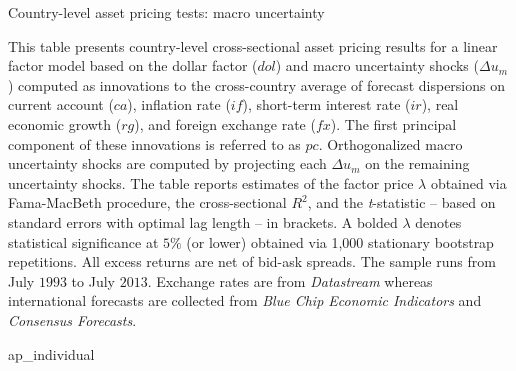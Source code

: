 \begin{landscape}
	
	\begin{table}[ht]
		\caption{Country-level asset pricing tests: macro uncertainty} \label{tab:ap_individual}
		
		\begin{footnotesize}
			This table presents country-level cross-sectional asset pricing results for a linear factor model based on the dollar factor ($dol$) and macro uncertainty shocks ($\Delta u_{m}$) computed as innovations to the cross-country average of forecast dispersions on current account ($ca$), inflation rate ($if$), short-term interest rate ($ir$), real economic growth ($rg$), and foreign exchange rate ($fx$). The first principal component of these innovations is referred to as $pc$. Orthogonalized macro uncertainty shocks are computed by projecting each $\Delta u_{m}$ on the remaining uncertainty shocks. The table reports estimates of the factor price $\lambda$ obtained via Fama-MacBeth procedure, the cross-sectional $R^{2}$, and the \emph{t}-statistic -- based on \citet{newey_west1987} standard errors with \citet{andrews1991} optimal lag length -- in brackets. A bolded $\lambda$ denotes statistical significance at $5\%$ (or lower) obtained via 1,000 stationary bootstrap repetitions. All excess returns are net of bid-ask spreads. The sample runs from July $1993$ to July $2013$. Exchange rates are from \textit{Datastream} whereas international forecasts are collected from \textit{Blue Chip Economic Indicators} and \textit{Consensus Forecasts}.
		\end{footnotesize}
		
		{ap_individual}
		
	\end{table}
\end{landscape}

